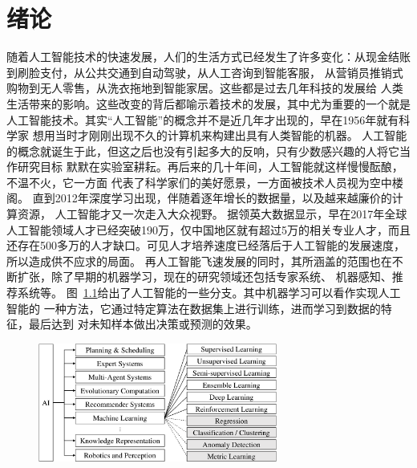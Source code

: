 \chapter{绪论}\label{chap:introduction}
随着人工智能技术的快速发展，人们的生活方式已经发生了许多变化：从现金结账到刷脸支付，从公共交通到自动驾驶，从人工咨询到智能客服，
从营销员推销式购物到无人零售，从洗衣拖地到智能家居。这些都是过去几年科技的发展给
人类生活带来的影响。这些改变的背后都喻示着技术的发展，其中尤为重要的一个就是
人工智能技术。其实``人工智能''的概念并不是近几年才出现的，早在1956年就有科学家
想用当时才刚刚出现不久的计算机来构建出具有人类智能的机器。
人工智能的概念就诞生于此，但这之后也没有引起多大的反响，只有少数感兴趣的人将它当作研究目标
默默在实验室耕耘。再后来的几十年间，人工智能就这样慢慢酝酿，不温不火，它一方面
代表了科学家们的美好愿景，一方面被技术人员视为空中楼阁。
直到2012年深度学习出现，伴随着逐年增长的数据量，以及越来越廉价的计算资源，
人工智能才又一次走入大众视野。
据领英大数据显示，早在2017年全球人工智能领域人才已经突破190万，仅中国地区就有超过5万的相关专业人才，而且还存在500多万的人才缺口。可见人才培养速度已经落后于人工智能的发展速度，所以造成供不应求的局面。
再人工智能飞速发展的同时，其所涵盖的范围也在不断扩张，除了早期的机器学习，现在的研究领域还包括专家系统、
机器感知、推荐系统等。
图~\ref{fig:ai}给出了人工智能的一些分支。其中机器学习可以看作实现人工智能的
一种方法，它通过特定算法在数据集上进行训练，进而学习到数据的特征，最后达到
对未知样本做出决策或预测的效果。
\begin{figure}[htbp]
  \centering
  \includegraphics[width=0.7\textwidth]{Img/ai-content.pdf}
  \label{fig:ai}
\end{figure}

